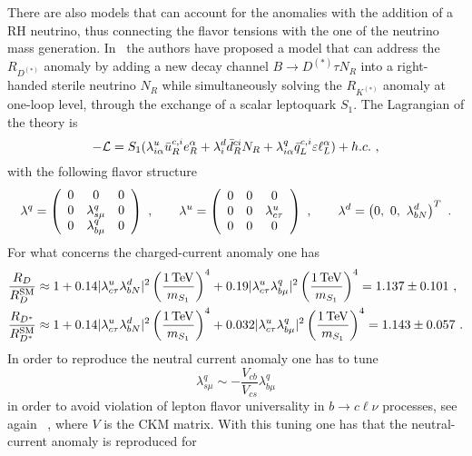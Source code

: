 \documentclass[a4paper,11pt]{article}
\newcommand{\be}{\begin{equation}}
\newcommand{\ee}{\end{equation}}
\newcommand{\nn}{\nonumber}
\begin{document}
There are also models that can account for the anomalies with the addition of a RH neutrino, thus connecting the flavor tensions with the one of the neutrino mass generation. In~\cite{Azatov:2018kzb} the authors have proposed a model that can address the $R_{D^{(*)}}$ anomaly by adding a new decay channel $B\to D^{(*)} \tau N_R$ into a right-handed sterile neutrino $N_R$ 
while simultaneously solving the 
$R_{K^{(*)}}$ anomaly at one-loop level, through the exchange of a scalar leptoquark $S_1$. The Lagrangian of the theory is 
\be\label{eq:lag_S1}
	-{\cal L} = S_1 (
	{\bf \lambda}^u_{i\alpha} \bar u_R^{c,i}  e_R^\alpha + 
	{\bf \lambda}^d_i  \bar d_R^{ci}  N_R  +
	{\bf \lambda}^q_{i\alpha} \bar q_L^{c,i}  \varepsilon \ell_L^\alpha
	) + h.c.~,
\ee
with the following flavor structure
\be
	{\bf \lambda}^q = \left( \begin{array}{ccc}
					0 & 0 & 0 \\
					0 & \lambda_{s\mu}^q & 0 \\
					0 & \lambda_{b\mu}^q & 0
					\end{array}\right)~, \qquad
	{\bf \lambda}^u = \left( \begin{array}{ccc}
					0 & 0 & 0 \\
					0 & 0 & \lambda_{c\tau}^u \\
					0 & 0 & 0
					\end{array}\right)~, \qquad
	{\bf \lambda}^d = \left( 0, ~ 0, ~ \lambda_{bN}^d \right)^T
	\label{eq:flav_structure_S} \ .
\ee
For what concerns the charged-current anomaly one has~\cite{Azatov:2018kzb,Amhis:2019ckw}
\begin{align}
	 \frac{R_D}{R_D^{{\rm SM}}} &\approx 1 + 0.14 |\lambda_{c\tau}^{u} \lambda^d_{b N}|^2 \left(\dfrac{1\, {\rm TeV}}{m_{S_1}}\right)^4 + 0.19 |\lambda_{c\tau}^{u} \lambda^q_{b\mu}|^2 \left(\dfrac{1\, {\rm TeV}}{m_{S_1}}\right)^4 = 1.137\pm 0.101~, \nn \\
	  \frac{R_{D^*}}{R_{D^*}^{{\rm SM}}} &\approx  1 + 0.14 |\lambda_{c\tau}^{u} \lambda^d_{b N}|^2 \left(\dfrac{1\, {\rm TeV}}{m_{S_1}}\right)^4 + 0.032 |\lambda_{c\tau}^{u} \lambda^q_{b\mu}|^2  \left(\dfrac{1\, {\rm TeV}}{m_{S_1}}\right)^4 = 1.143 \pm 0.057 \ .
\end{align}
 In order to reproduce the neutral current anomaly one has to tune
\be\label{eq:tuning}
\lambda^q_{s\mu} \sim -\frac{V_{cb}}{V_{cs}} \lambda^q_{b\mu}
\ee
in order to avoid violation of lepton flavor universality in $b\to c\ell \nu$ processes, see again ~\cite{Azatov:2018kzb}, where $V$ is the CKM matrix. With this tuning one has that the neutral-current anomaly is reproduced for
\end{document}
